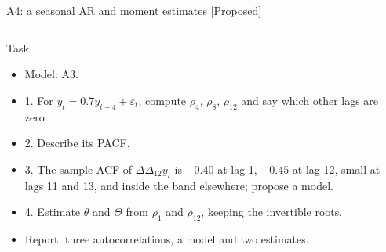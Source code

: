 \begin{frame}{A4: a seasonal AR and moment estimates [Proposed]}
\propsub
\itemsize{\scriptsize}
\begin{columns}[T]
\begin{column}{\taskw}
\begin{block}{Task}
\begin{itemize}
    \item Model: A3.
    \item 1. For $y_t = 0.7y_{t-4} + \varepsilon_t$, compute $\rho_4$, $\rho_8$, $\rho_{12}$ and say which other lags are zero.
    \item 2. Describe its PACF.
    \item 3. The sample ACF of $\Delta\Delta_{12}y_t$ is $-0.40$ at lag 1, $-0.45$ at lag 12, small at lags 11 and 13, and inside the band elsewhere; propose a model.
    \item 4. Estimate $\theta$ and $\Theta$ from $\rho_1$ and $\rho_{12}$, keeping the invertible roots.
    \item Report: three autocorrelations, a model and two estimates.
\end{itemize}
\end{block}
\end{column}
\begin{column}{\solw}
\end{column}
\end{columns}
\end{frame}

